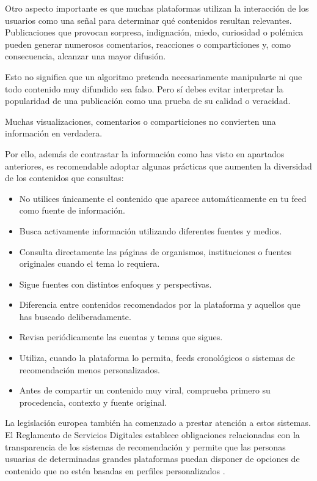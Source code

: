 \documentclass[
  spanish,
  a4paper,
  openany]{book}
\begin{document}
Otro aspecto importante es que muchas plataformas utilizan la interacción de los usuarios como una señal para determinar qué contenidos resultan relevantes. Publicaciones que provocan sorpresa, indignación, miedo, curiosidad o polémica pueden generar numerosos comentarios, reacciones o comparticiones y, como consecuencia, alcanzar una mayor difusión.

Esto no significa que un algoritmo pretenda necesariamente manipularte ni que todo contenido muy difundido sea falso. Pero sí debes evitar interpretar la popularidad de una publicación como una prueba de su calidad o veracidad.

Muchas visualizaciones, comentarios o comparticiones no convierten una información en verdadera.

Por ello, además de contrastar la información como has visto en apartados anteriores, es recomendable adoptar algunas prácticas que aumenten la diversidad de los contenidos que consultas:

\begin{itemize}
\item
  No utilices únicamente el contenido que aparece automáticamente en tu feed como fuente de información.
\item
  Busca activamente información utilizando diferentes fuentes y medios.
\item
  Consulta directamente las páginas de organismos, instituciones o fuentes originales cuando el tema lo requiera.
\item
  Sigue fuentes con distintos enfoques y perspectivas.
\item
  Diferencia entre contenidos recomendados por la plataforma y aquellos que has buscado deliberadamente.
\item
  Revisa periódicamente las cuentas y temas que sigues.
\item
  Utiliza, cuando la plataforma lo permita, feeds cronológicos o sistemas de recomendación menos personalizados.
\item
  Antes de compartir un contenido muy viral, comprueba primero su procedencia, contexto y fuente original.
\end{itemize}

La legislación europea también ha comenzado a prestar atención a estos sistemas. El Reglamento de Servicios Digitales establece obligaciones relacionadas con la transparencia de los sistemas de recomendación y permite que las personas usuarias de determinadas grandes plataformas puedan disponer de opciones de contenido que no estén basadas en perfiles personalizados \citep{CE-servicios-digitales}.
\end{document}
